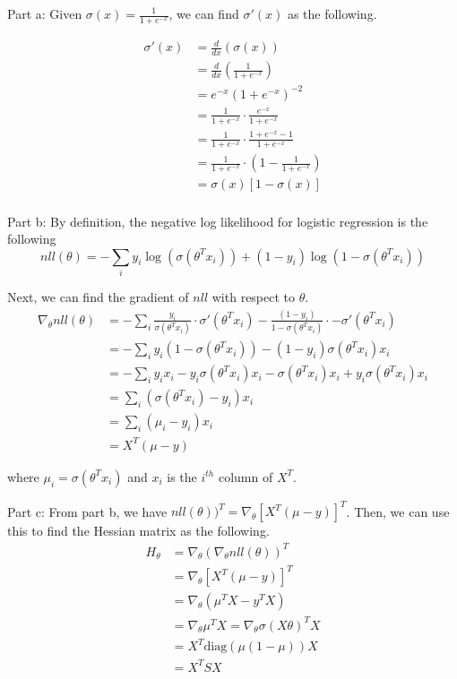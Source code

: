 \documentclass[12pt,letterpaper]{hmcpset}
\begin{document}
\begin{solution}
	Part a: Given $\sigma(x) = \frac{1}{1 + e^{-x}}$, we can find $\sigma'(x)$ as the following.
	
	\begin{align*}
		\sigma'(x) &= \frac{d}{dx}(\sigma(x))\\
		&= \frac{d}{dx}(\frac{1}{1+e^{-x}})\\
		&= e^{-x}(1+e^{-x})^{-2}\\
		&=  \frac{1}{1 + e^{-x}} \cdot  \frac{e^{-x}}{1 + e^{-x}}\\
		&= \frac{1}{1 + e^{-x}} \cdot  \frac{1 + e^{-x} - 1}{1 + e^{-x}}\\
		&= \frac{1}{1 + e^{-x}} \cdot  (1- \frac{1}{1 + e^{-x}})\\
		&= \sigma(x)[1-\sigma(x)]\\	
	\end{align*}

	Part b:
	By definition, the negative log likelihood for logistic regression is the following
	$$nll(\theta) = - \sum_{i} y_i \log(\sigma(\theta^T x_i)) + (1 - y_i)\log(1 - \sigma(\theta^T x_i))$$

Next, we can find the gradient of $nll$ with respect to $\theta$.
\begin{align*}
	\nabla_{\theta}nll(\theta) &= - \sum_{i} \frac{y_i}{\sigma(\theta^T x_i)} \cdot \sigma'(\theta^T x_i) - \frac{(1 - y_i)}{1 - \sigma(\theta^T x_i)} \cdot -\sigma'(\theta^T x_i)\\
	&= - \sum_{i} y_i (1 - \sigma(\theta^T x_i)) - (1 - y_i)\sigma(\theta^T x_i)x_i\\
	&= - \sum_{i} y_i x_i - y_i \sigma(\theta^T x_i) x_i - \sigma(\theta^T x_i) x_i + y_i \sigma(\theta^T x_i) x_i\\
	&= \sum_{i} (\sigma(\theta^T x_i) - y_i) x_i\\
	&= \sum_{i} (\mu_i - y_i) x_i\\
	&= X^T (\mu - y)
\end{align*}


where $\mu_i = \sigma(\theta^T x_i)$ and $x_i$ is the $i^{th}$ column of $X^T$.

Part c: From part b, we have $nll(\theta))^T = \nabla_{\theta}[X^T (\mu - y)]^T$. Then, we can use this to find the Hessian matrix as the following.
\begin{align*}
H_{\theta} &= \nabla_{\theta} (\nabla_{\theta}nll(\theta))^T\\
& = \nabla_{\theta}[X^T (\mu - y)]^T\\
&= \nabla_{\theta} (\mu^T X - y^T X)\\
&= \nabla_{\theta} \mu^T X = \nabla_{\theta} \sigma(X\theta)^T X\\
&= X^T \text{diag}(\mu(1 - \mu))X\\
&= X^T SX
\end{align*}



\end{solution}
\end{document}

